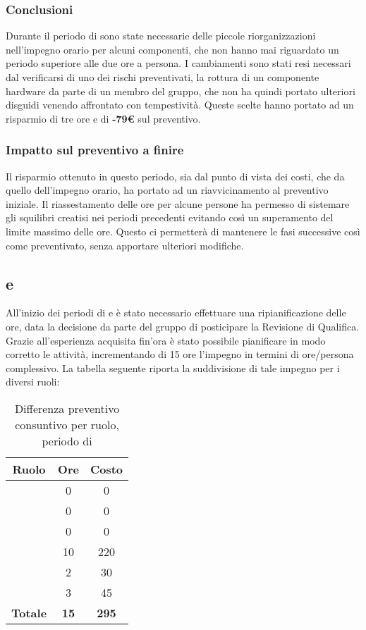 \subsubsection{Conclusioni}
Durante il periodo di \PA{} sono state necessarie delle piccole riorganizzazioni nell'impegno orario per alcuni componenti, che non hanno mai riguardato un periodo superiore alle due ore a persona.
I cambiamenti sono stati resi necessari dal verificarsi di uno dei rischi preventivati, la rottura di un componente hardware da parte di un membro del gruppo, che non ha quindi portato ulteriori disguidi venendo affrontato con tempestività.
Queste scelte hanno portato ad un risparmio di tre ore e di \textbf{-79€} sul preventivo.
\subsubsection{Impatto sul preventivo a finire}
Il risparmio ottenuto in questo periodo, sia dal punto di vista dei costi, che da quello dell'impegno orario, ha portato ad un riavvicinamento al preventivo iniziale. Il riassestamento delle ore per alcune persone ha permesso di sistemare gli squilibri creatisi nei periodi precedenti evitando così un superamento del limite massimo delle ore. Questo ci permetterà di mantenere le fasi successive così come preventivato, senza apportare ulteriori modifiche.

\subsection{\PD{} e \Cod{}}
All'inizio dei periodi di \PD{} e \Cod{} è stato necessario effettuare una ripianificazione delle ore, data la decisione da parte del gruppo di posticipare la Revisione di Qualifica. Grazie all'esperienza acquisita fin'ora è stato possibile pianificare in modo corretto le attività, incrementando di 15 ore l'impegno in termini di ore/persona complessivo. La tabella seguente riporta la suddivisione di tale impegno per i diversi ruoli:
\begin{table}[H]
	\centering
	\begin{tabular}{|c|c|c|}
		\hline
		\textbf{Ruolo} &
		\textbf{Ore} &
		\textbf{Costo} \\
		\hline
		\Responsabile & 0 & 0\\
		\hline
		\Amministratore & 0 & 0\\
		\hline
		\Analista & 0 & 0\\
		\hline
		\Progettista & 10 & 220 \\
		\hline
		\Verificatore & 2 & 30 \\
		\hline
		\Programmatore & 3 & 45 \\
		\hline
		\textbf{Totale} & \textbf{15} & \textbf{295} \\
		\hline
	\end{tabular}
	\caption{Differenza preventivo consuntivo per ruolo, periodo di \PA}
\end{table}

